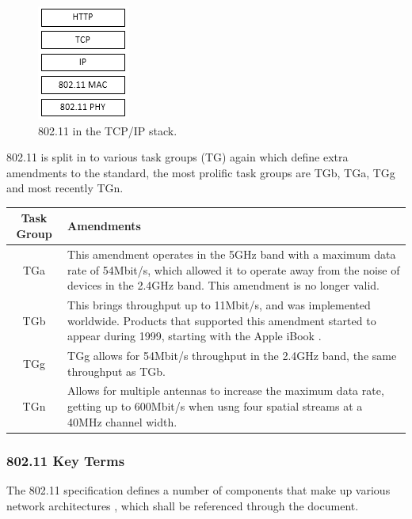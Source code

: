 \begin{figure}[htb!]
	\centering\includegraphics{intro/diagrams/tcpip.png}
	\caption{802.11 in the TCP/IP stack.}
\end{figure}

802.11 is split in to various task groups (TG) again which define extra amendments to the standard, the most prolific task groups are TGb, TGa, TGg and most recently TGn.

\begin{table}[htb!]
\begin{center}
	\begin{tabular}{| c | p{ 5cm } |}
		\hline
		\textbf{Task Group} & \textbf{Amendments} \\ \hline
		TGa & This amendment operates in the 5GHz band with a maximum data rate of 54Mbit/s, which allowed it to operate away from the noise of devices in the 2.4GHz band. This amendment is no longer valid. \\ \hline
		TGb & This brings throughput up to 11Mbit/s, and was implemented worldwide. Products that supported this amendment started to appear during 1999, starting with the Apple iBook \cite{intro:apple_ibook}. \\ \hline
		TGg & TGg allows for 54Mbit/s throughput in the 2.4GHz band, the same throughput as TGb. \\ \hline
		TGn & Allows for multiple antennas to increase the maximum data rate, getting up to 600Mbit/s when usng four spatial streams at a 40MHz channel width. \\ 
		\hline
	\end{tabular}
\end{center}
\end{table}

\subsubsection{802.11 Key Terms}

The 802.11 specification defines a number of components that make up various network architectures \cite{intro:80211_lecture}, which shall be referenced through the document.

